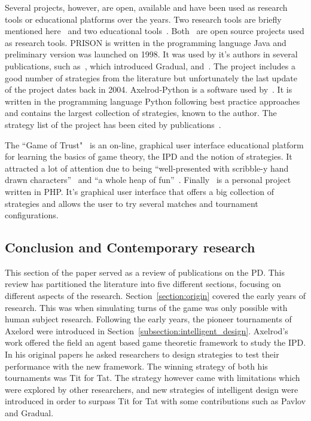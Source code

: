 \documentclass{article}
\theoremstyle{definition}
\begin{document}
Several projects, however, are open, available and have been used as research
tools or educational platforms over the years. Two research tools are briefly
mentioned here~\cite{prison, axelrodproject} and two educational
tools~\cite{pd_trust, pd_game}. Both~\cite{prison, axelrodproject} are open
source projects used as research tools. PRISON is written in the programming
language Java and preliminary version was launched on 1998. It was used by it's
authors in several publications, such as~\cite{Beaufils1997}, which introduced
Gradual, and~\cite{Beaufils1988}. The project includes a good number of
strategies from the literature but unfortunately the last update of the project
dates back in 2004. Axelrod-Python is a software used
by~\cite{Knight2017,KnightHGC17, Goodman2018, Wang2017}. It is written in the
programming language Python following best practice approaches and contains the
largest collection of strategies, known to the author. The strategy list of
the project has been cited by publications~\cite{Anastassacos2018, Hayes2017,
Neumann2018}.

The ``Game of Trust"~\cite{pd_trust} is an on-line, graphical user interface
educational platform for learning the basics of game theory, the IPD
and the notion of strategies. It attracted a lot of attention
due to being ``well-presented with scribble-y hand drawn
characters''~\cite{trust_blogb} and ``a whole heap of fun''~\cite{trust_bloga}.
Finally~\cite{pd_game} is a personal project written in PHP. It's graphical user
interface that offers a big collection of strategies and allows the user to try
several matches and tournament configurations.

\subsection{Conclusion and Contemporary research}\label{section:contemporary_period}

This section of the paper served as a review of publications on the PD.
This review has partitioned the literature into five different sections,
focusing on different aspects of the research. Section~\ref{section:origin}
covered the early years of research. This was when simulating turns of the game
was only possible with human subject research.
Following the early years, the pioneer tournaments of Axelord were introduced in
Section~\ref{subsection:intelligent_design}. Axelrod's work offered the field an
agent based game theoretic framework to study the IPD.
In his original papers he asked researchers to design strategies to test their
performance with the new framework. The winning strategy of both his tournaments
was Tit for Tat. The strategy however came with limitations which were explored
by other researchers, and new strategies of intelligent design were introduced in
order to surpass Tit for Tat with some contributions such as Pavlov and Gradual.
\end{document}
